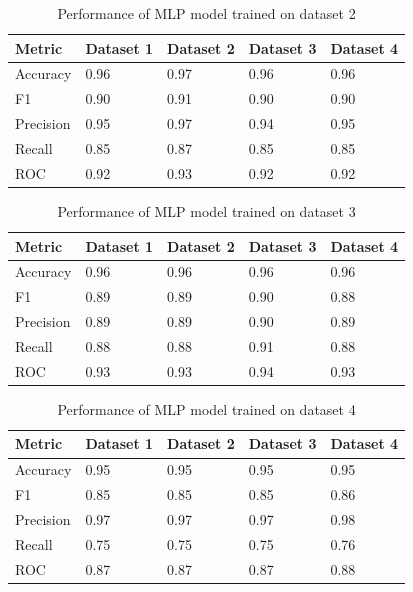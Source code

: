 \begin{table}[hbt]
\caption{Performance of MLP model trained on dataset 2}\label{tab:performance_of_mlp_model_trained_on_dataset_2}
\begin{tabular*}{\tblwidth}{@{}LLLLL@{}}
\toprule
    Metric & Dataset 1 & Dataset 2 & Dataset 3 & Dataset 4 \\
\midrule
    Accuracy & 0.96 & 0.97 & 0.96 & 0.96 \\
    F1 & 0.90 & 0.91 & 0.90 & 0.90 \\
    Precision & 0.95 & 0.97 & 0.94 & 0.95 \\
    Recall & 0.85 & 0.87 & 0.85 & 0.85 \\
    ROC & 0.92 & 0.93 & 0.92 & 0.92 \\
\bottomrule
\end{tabular*}
\end{table}

\begin{table}[hbt]
\caption{Performance of MLP model trained on dataset 3}\label{tab:performance_of_mlp_model_trained_on_dataset_3}
\begin{tabular*}{\tblwidth}{@{}LLLLL@{}}
\toprule
    Metric & Dataset 1 & Dataset 2 & Dataset 3 & Dataset 4 \\
\midrule
    Accuracy & 0.96 & 0.96 & 0.96 & 0.96 \\
    F1 & 0.89 & 0.89 & 0.90 & 0.88 \\
    Precision & 0.89 & 0.89 & 0.90 & 0.89 \\
    Recall & 0.88 & 0.88 & 0.91 & 0.88 \\
    ROC & 0.93 & 0.93 & 0.94 & 0.93 \\
\bottomrule
\end{tabular*}
\end{table}

\begin{table}[hbt]
\caption{Performance of MLP model trained on dataset 4}\label{tab:performance_of_mlp_model_trained_on_dataset_4}
\begin{tabular*}{\tblwidth}{@{}LLLLL@{}}
\toprule
    Metric & Dataset 1 & Dataset 2 & Dataset 3 & Dataset 4 \\
\midrule
    Accuracy & 0.95 & 0.95 & 0.95 & 0.95 \\
    F1 & 0.85 & 0.85 & 0.85 & 0.86 \\
    Precision & 0.97 & 0.97 & 0.97 & 0.98 \\
    Recall & 0.75 & 0.75 & 0.75 & 0.76 \\
    ROC & 0.87 & 0.87 & 0.87 & 0.88 \\
\bottomrule
\end{tabular*}
\end{table}

